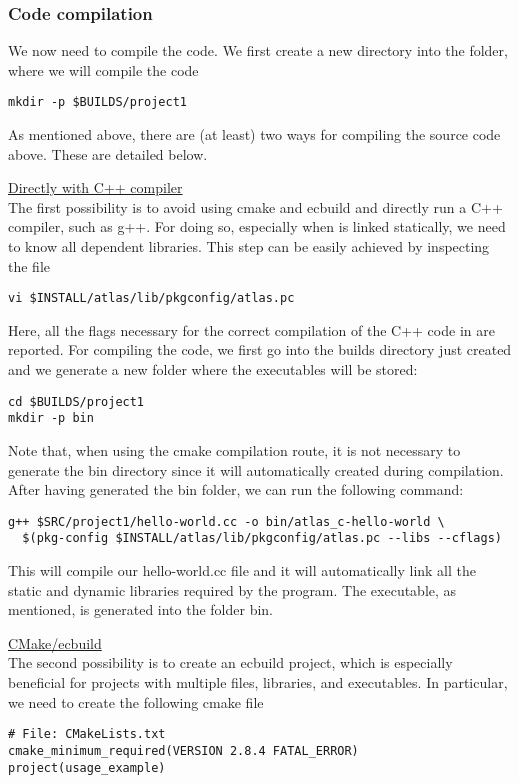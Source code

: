 \subsubsection*{Code compilation}
We now need to compile the code. We first create a new directory
into the  folder, where we will compile the code
%
\begin{lstlisting}[style=BashStyle]
mkdir -p $BUILDS/project1
\end{lstlisting}
%
As mentioned above, there are (at least) two ways for compiling 
the source code above. These are detailed below.
%
\begin{description}
%
\item \underline{Directly with C++ compiler}\\[0.5em]
%
The first possibility is to 
avoid using cmake and ecbuild and directly run a C++ compiler, 
such as g++. For doing so, especially when \Atlas is linked statically,
we need to know all \Atlas dependent libraries. This step can be easily
achieved by inspecting the file 
%
\begin{lstlisting}[style=BashStyle]
vi $INSTALL/atlas/lib/pkgconfig/atlas.pc
\end{lstlisting}
%
Here, all the flags necessary for the correct compilation 
of the C++ code in  are reported. For 
compiling the code, we first go into the builds directory 
just created and we generate a new folder where the executables 
will be stored: 
%
\begin{lstlisting}[style=BashStyle]
cd $BUILDS/project1
mkdir -p bin
\end{lstlisting}
%
Note that, when using the cmake compilation route, it is not 
necessary to generate the bin directory since it will automatically 
created during compilation.
After having generated the bin folder, we can run the following 
command:
%
\begin{lstlisting}[style=BashStyle]
g++ $SRC/project1/hello-world.cc -o bin/atlas_c-hello-world \ 
  $(pkg-config $INSTALL/atlas/lib/pkgconfig/atlas.pc --libs --cflags)
\end{lstlisting}
%
This will compile our hello-world.cc file and it will automatically 
link all the static and dynamic libraries required by the program. 
The executable, as mentioned, is generated into the folder bin.
%
\item \underline{CMake/ecbuild}\\[0.5em]
%
The second possibility is to create an ecbuild project, which is 
especially beneficial for projects with multiple files, libraries,
and executables.
 In particular, we need to create the following 
cmake file
%
\begin{lstlisting}[style=CMakeStyle]
# File: CMakeLists.txt
cmake_minimum_required(VERSION 2.8.4 FATAL_ERROR)
project(usage_example)


\end{lstlisting}
\end{description}
